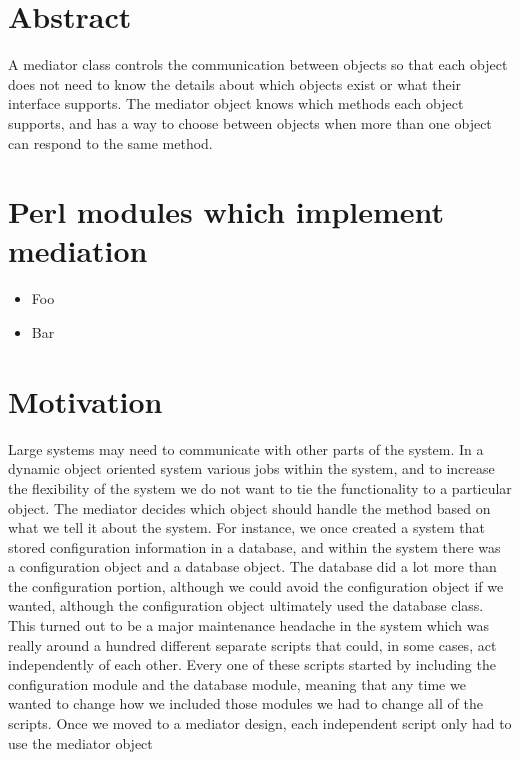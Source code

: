 
    \section{Abstract}

A mediator class controls the communication between objects so that each 
object does not need to know the details about which objects exist or 
what their interface supports.  The mediator object knows which methods
each object supports, and has a way to choose between objects when more
than one object can respond to the same method.

    \section{Perl modules which implement mediation}
    
\begin{itemize}
\item Foo
\item Bar
\end{itemize}

    \section{Motivation}

Large systems may need to communicate with other parts of the system.
In a dynamic object oriented system various jobs within the system, and
to increase the flexibility of the system we do not want to tie the functionality
to a particular object.  The mediator decides which object should handle the
method based on what we tell it about the system.  For instance, we once created
a system that stored configuration information in a database, and within the system
there was a configuration object and a database object.  The database did a lot
more than the configuration portion, although we could avoid the configuration
object if we wanted, although the configuration object ultimately used the database
class.  This turned out to be a major maintenance headache in the system which was
really around a hundred different separate scripts that could, in some cases, act
independently of each other.  Every one of these scripts started by including the
configuration module and the database module, meaning that any time we wanted to
change how we included those modules we had to change all of the scripts.  Once
we moved to a mediator design, each independent script only had to use the mediator
object 

